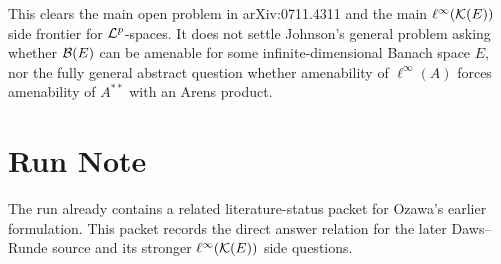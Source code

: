\documentclass[11pt]{article}
\begin{document}
This clears the main open problem in arXiv:0711.4311 and the main
\(\ell^\infty({\cal K}(E))\) side frontier for \({\cal L}^p\)-spaces. It does
not settle Johnson's general problem asking whether \({\cal B}(E)\) can be
amenable for some infinite-dimensional Banach space \(E\), nor the fully
general abstract question whether amenability of \(\ell^\infty(A)\) forces
amenability of \(A^{**}\) with an Arens product.

\section*{Run Note}

The run already contains a related literature-status packet for Ozawa's earlier
formulation. This packet records the direct answer relation for the later
Daws--Runde source and its stronger \(\ell^\infty({\cal K}(E))\) side
questions.
\end{document}
